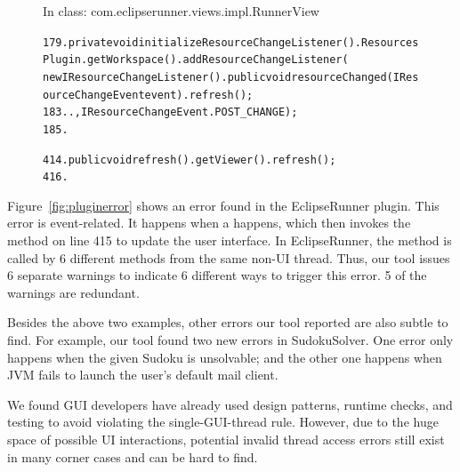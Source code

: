 \begin{figure}[t]
\hspace{4mm}\small{In class: com.eclipserunner.views.impl.RunnerView}
\vspace{-2mm}
\begin{CodeOut}
\begin{alltt} 
179.private void initializeResourceChangeListener() .  ResourcesPlugin.getWorkspace().addResourceChangeListener(
        new IResourceChangeListener() .      public void resourceChanged(IResourceChangeEvent event) .        refresh();
183.      .  \ttrcb, IResourceChangeEvent.POST\_CHANGE);
185.\ttrcb

414.public void refresh() .  getViewer().refresh();
416.\ttrcb
\end{alltt}
\end{CodeOut}
\vspace*{-15pt}
\end{figure}

Figure~\ref{fig:pluginerror} shows an error found in the EclipseRunner
plugin. This error is event-related. It happens when a 
 happens, which then invokes the 
method on line 415 to update the user interface. In EclipseRunner,
the  method is
called by 6 different methods from the same non-UI thread. Thus, our
tool issues 6 separate warnings to indicate
6 different ways to trigger this error. 5 of the warnings are redundant.

Besides the above two examples, other errors our tool reported are also
subtle to find. For example, our tool found two new errors in SudokuSolver.
One error only happens when
the given Sudoku is unsolvable; and the other one happens
when  JVM fails to launch the %
user's default mail client.%

We found GUI developers have already
used design patterns, runtime checks, and testing to avoid violating
the single-GUI-thread rule. However, due to the huge space of
possible UI interactions, potential
invalid thread access errors still exist in many corner cases and
can be hard to find. 


